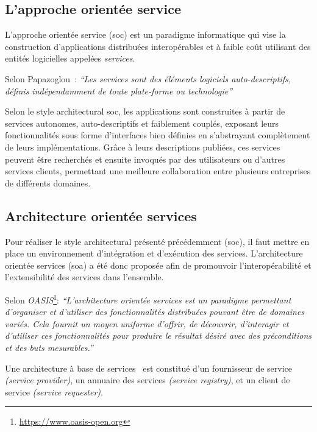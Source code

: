   \subsection{L'approche orientée service}
  \label{sec:soc}
  L'approche orientée service (\acrshort{soc}) est un paradigme
  informatique qui vise la construction d'applications distribuées
  interopérables et à faible coût utilisant des entités logicielles
  appelées \emph{services}.\bigskip

  Selon Papazoglou~\cite{papazoglou2003service}: \textit{``Les
    services sont des éléments logiciels auto-descriptifs, définis
    indépendamment de toute plate-forme ou technologie''}\bigskip

  Selon le style architectural \acrshort{soc}, les applications sont
  construites à partir de services autonomes, auto-descriptifs et
  faiblement couplés, exposant leurs fonctionnalités sous forme
  d'interfaces bien définies en s'abstrayant complètement de leurs
  implémentations. Grâce à leurs descriptions publiées, ces services
  peuvent être recherchés et ensuite invoqués par des utilisateurs ou
  d'autres services clients, permettant une meilleure collaboration
  entre plusieurs entreprises de différents domaines.\medskip

  \subsection{Architecture orientée services}
  \label{sec:soa}
  Pour réaliser le style architectural présenté précédemment
  (\acrshort{soc}), il faut mettre en place un environnement
  d'intégration et d'exécution des services. L'architecture orientée
  services (\acrshort{soa}) a été donc proposée afin de promouvoir
  l'interopérabilité et l'extensibilité des services dans
  l'ensemble.\bigskip

  Selon \textit{OASIS}\footnote{\url{https://www.oasis-open.org}}:
  \textit{``L'architecture orientée services est un paradigme
    permettant d'organiser et d'utiliser des fonctionnalités
    distribuées pouvant être de domaines variés. Cela fournit un moyen
    uniforme d'offrir, de découvrir, d'interagir et d'utiliser ces
    fonctionnalités pour produire le résultat désiré avec des
    préconditions et des buts mesurables.''}\bigskip

  Une architecture à base de
  services~\cite{gottschalk2002introduction} est constitué d'un
  fournisseur de service \textit{(service provider)}, un annuaire des
  services \textit{(service registry)}, et un client de service
  \textit{(service requester)}.


